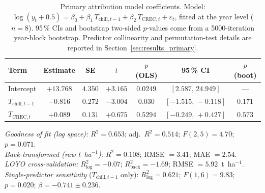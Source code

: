 \begin{table}[H]
\caption{Primary attribution model coefficients. Model: $\log(y_{t}+0.5) = \beta_{0} + \beta_{1}\,T_{\text{chill},t-1} + \beta_{2}\,T_{\text{CREC},t} + \varepsilon_{t}$, fitted at the year level ($n=8$). 95\,\% CIs and bootstrap two-sided $p$-values come from a 5000-iteration year-block bootstrap. Predictor collinearity and permutation-test details are reported in Section~\ref{sec:results_primary}.\label{tab:primary_coef}}
\centering
\footnotesize
\setlength{\tabcolsep}{4pt}
\begin{tabular}{lcccccc}
\toprule
\textbf{Term} & \textbf{Estimate} & \textbf{SE} & \textbf{$t$} & \textbf{$p$ (OLS)} & \textbf{95\,\% CI} & \textbf{$p$ (boot)} \\
\midrule
Intercept                & $+13.768$ & $4.350$ & $+3.165$ & $0.0249$         & $[2.587,\,24.949]$  & ---     \\
$T_{\text{chill},t-1}$   & $-0.816$  & $0.272$ & $-3.004$ & $\mathbf{0.030}$ & $[-1.515,\,-0.118]$ & $0.171$ \\
$T_{\text{CREC},t}$      & $+0.089$  & $0.131$ & $+0.675$ & $0.5294$         & $[-0.249,\,+0.427]$ & $0.573$ \\
\bottomrule
\end{tabular}

\vspace{4pt}
\footnotesize
\noindent\textit{Goodness of fit (log space):} $R^{2}=0.653$; adj.\ $R^{2}=0.514$; $F(2,5)=4.70$; $p=0.071$. \\
\textit{Back-transformed (raw t~ha$^{-1}$):} $R^{2}=0.108$; RMSE $=3.41$; MAE $=2.54$. \\
\textit{LOYO cross-validation:} $R^{2}_{\log}=-0.07$; $R^{2}_{\text{back}}=-1.69$; RMSE $=5.92$~t~ha$^{-1}$. \\
\textit{Single-predictor sensitivity} ($T_{\text{chill},t-1}$ only): $R^{2}_{\log}=0.621$; $F(1,6)=9.83$; $p=0.020$; $\beta=-0.741\pm0.236$.
\end{table}
